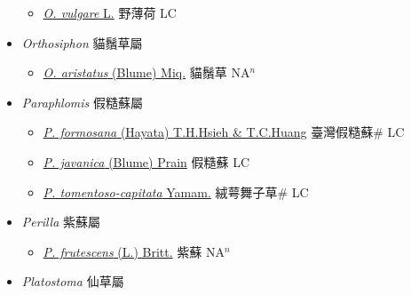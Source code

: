 \begin{itemize}
  \begin{itemize}
        \item[] \href{http://www.theplantlist.org/tpl1.1/search?q=Origanum+vulgare}{\textit{O. vulgare} L.}   野薄荷 LC
  \end{itemize}
 \item[] \textit{Orthosiphon} 貓鬚草屬
                    
  \begin{itemize}
        \item[] \href{http://www.theplantlist.org/tpl1.1/search?q=Orthosiphon+aristatus}{\textit{O. aristatus} (Blume) Miq.}   貓鬚草 NA$^n$
  \end{itemize}
 \item[] \textit{Paraphlomis} 假糙蘇屬
                    
  \begin{itemize}
        \item[] \href{http://www.theplantlist.org/tpl1.1/search?q=Paraphlomis+formosana}{\textit{P. formosana} (Hayata) T.H.Hsieh \& T.C.Huang}   臺灣假糙蘇\# LC
        \item[] \href{http://www.theplantlist.org/tpl1.1/search?q=Paraphlomis+javanica}{\textit{P. javanica} (Blume) Prain}   假糙蘇 LC
        \item[] \href{http://www.theplantlist.org/tpl1.1/search?q=Paraphlomis+tomentoso-capitata}{\textit{P. tomentoso-capitata} Yamam.}   絨萼舞子草\# LC
  \end{itemize}
 \item[] \textit{Perilla} 紫蘇屬
                    
  \begin{itemize}
        \item[] \href{http://www.theplantlist.org/tpl1.1/search?q=Perilla+frutescens}{\textit{P. frutescens} (L.) Britt.}   紫蘇 NA$^n$
  \end{itemize}
 \item[] \textit{Platostoma} 仙草屬
                    

\end{itemize}
